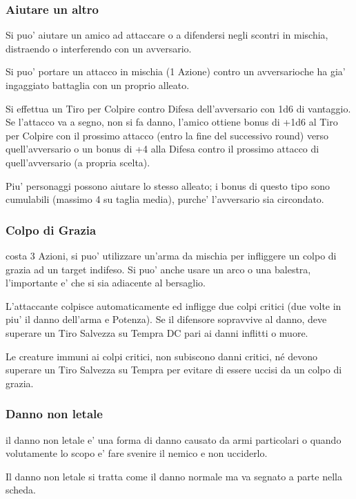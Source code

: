 \documentclass[a4paper,11pt,twoside,openany]{book}
\begin{document}
\subsubsection{Aiutare un altro} Si puo' aiutare un amico ad attaccare o a difendersi negli scontri in mischia, distraendo o interferendo con un avversario.

Si puo' portare un attacco in mischia (1 Azione) contro un avversarioche ha gia' ingaggiato battaglia con un proprio alleato.

Si effettua un Tiro per Colpire contro Difesa dell'avversario con 1d6 di vantaggio. Se l'attacco va a segno, non si fa danno, l'amico ottiene bonus di +1d6 al Tiro per Colpire con il prossimo attacco (entro la fine del successivo round) verso quell'avversario o un bonus di +4 alla Difesa contro il prossimo attacco di quell'avversario (a propria scelta). 

Piu' personaggi possono aiutare lo stesso alleato; i bonus di questo tipo sono cumulabili (massimo 4 su taglia media), purche' l'avversario sia circondato.

\subsubsection{Colpo di Grazia} costa 3 Azioni, si puo' utilizzare un'arma da mischia per infliggere un colpo di grazia ad un target indifeso. Si puo' anche usare un arco o una balestra, l'importante e' che si sia adiacente al bersaglio.

L'attaccante colpisce automaticamente ed infligge due colpi critici (due volte in piu' il danno dell'arma e Potenza). Se il difensore sopravvive al danno, deve superare un Tiro Salvezza su Tempra DC pari ai danni inflitti o muore.

Le creature immuni ai colpi critici, non subiscono danni critici, né devono superare un Tiro Salvezza su Tempra per evitare di essere uccisi da un colpo di grazia.

\subsubsection{Danno non letale} il danno non letale e' una forma di danno causato da armi particolari o quando volutamente lo scopo e' fare svenire il nemico e non ucciderlo.

Il danno non letale si tratta come il danno normale ma va segnato a parte nella scheda.
\end{document}

